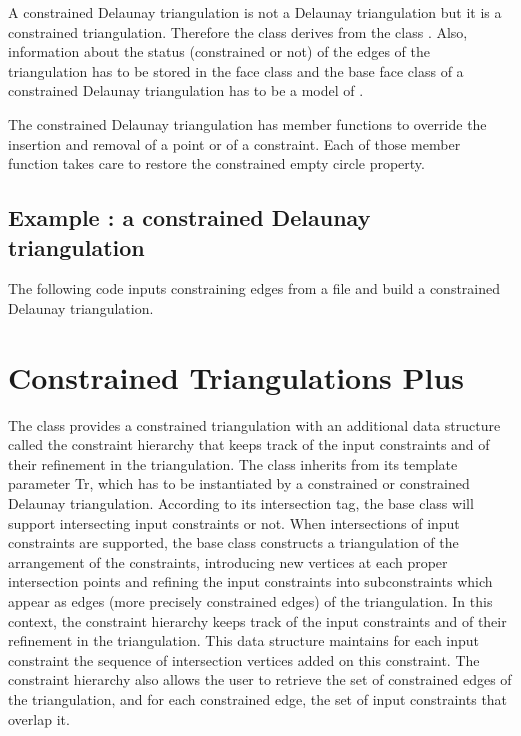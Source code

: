 A constrained Delaunay triangulation is not a Delaunay
triangulation but it is a constrained triangulation.
Therefore the class
derives from
the class .
Also, information about the status (constrained or not)
of the edges of the triangulation has to be stored
in the face class
 and the base face class
of a constrained Delaunay triangulation has to be a model
of .


The constrained Delaunay triangulation
has member functions to override the 
insertion and removal of a point or of a constraint.
Each of those member function takes care
to  restore
 the constrained empty circle
property.

\subsection{Example : a  constrained Delaunay triangulation}
\label{Subsection_2D_Triangulations_Constrained_Delaunay_Example}
The following code inputs constraining edges from a file
and build a constrained Delaunay  triangulation.


\section{Constrained Triangulations Plus}
\label{Section_2D_Triangulations_Constrained_Plus}

The class 
provides a constrained triangulation with an additional data
structure called the  constraint hierarchy 
that keeps track of  the input constraints and of their refinement
in the triangulation.
The class 
inherits from its template parameter Tr, which has to be instantiated
by a constrained  or constrained Delaunay  triangulation.
According to its intersection tag, the base class
will support intersecting input constraints or not.
When intersections of input constraints are supported,
the base class constructs a triangulation  of the  arrangement
of the constraints,
introducing new vertices at each proper intersection
points and  refining the input constraints into subconstraints
which appear as  edges (more precisely constrained edges) of the
triangulation. In this context, the constraint hierarchy 
keeps track of  the input constraints and of their refinement
in the triangulation. This data structure maintains for each 
input constraint
the sequence of intersection vertices added on this constraint.
The constraint hierarchy also allows the user to retrieve the set
of constrained edges of the triangulation, and for each
constrained edge,  the set of input constraints that overlap it.

